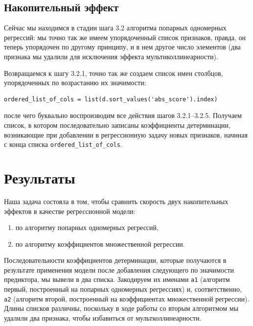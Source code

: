 \documentclass[a4paper,12pt]{article}
\begin{document}
\subsection{Накопительный эффект}

Сейчас мы находимся в стадии шага 3.2 алгоритма попарных одномерных регрессий: мы точно так же имеем упорядоченный список признаков, правда, он теперь упорядочен по другому принципу, и в нем другое число элементов (два признака мы удалили для исключения эффекта мультиколлинеарности).

Возвращаемся к шагу 3.2.1, точно так же создаем список имен столбцов, упорядоченных по возрастанию их значимости:

\begin{verbatim}
ordered_list_of_cols = list(d.sort_values('abs_score').index)
\end{verbatim}
после чего буквально воспроизводим все действия шагов 3.2.1–3.2.5. Получаем список, в котором последовательно записаны коэффициенты детерминации, возникающие при добавлении в регрессионную задачу новых признаков, начиная с конца списка \texttt{ordered\_list\_of\_cols}.

\section{Результаты}

Наша задача состояла в том, чтобы сравнить скорость двух накопительных эффектов в качестве регрессионной модели:

\medskip\noindent
\begin{enumerate}
	\item по алгоритму попарных одномерных регрессий,
	\item по алгоритму коэффициентов множественной регрессии.
\end{enumerate}

\medskip\noindent
Последовательности коэффициентов детерминации, которые получаются в результате применения модели после добавления следующего по значимости предиктора, мы вывели в два списка. Закодируем их именами \texttt{a1} (алгоритм первый, построенный на попарных одномерных регрессиях) и, соответственно, \texttt{a2} (алгоритм второй, построенный на коэффициентах множественной регрессии). Длины списков различны, поскольку в ходе работы со вторым алгоритмом мы удалили два признака, чтобы избавиться от мультколлинеарности.
\end{document}
